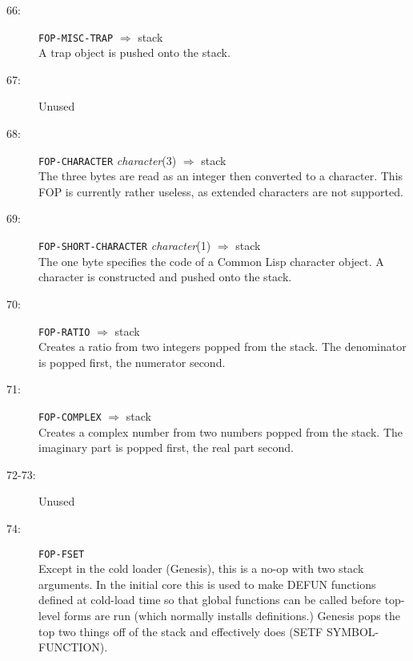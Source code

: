 \begin{description}
\item[66:] \hspace{2em} {\tt FOP-MISC-TRAP} \hspace{2em} $\Rightarrow$ \hspace{2em} stack \\
A trap object is pushed onto the stack.

\item[67:] Unused

\item[68:] \hspace{2em} {\tt FOP-CHARACTER} \hspace{2em} {\it character}(3) \hspace{2em} $\Rightarrow$ \hspace{2em} stack \\
The three bytes are read as an integer then converted to a character.  This FOP
is currently rather useless, as extended characters are not supported.

\item[69:] \hspace{2em} {\tt FOP-SHORT-CHARACTER} \hspace{2em} {\it character}(1) \hspace{2em}
$\Rightarrow$ \hspace{2em} stack \\
The one byte specifies the code of a Common Lisp character object.  A character
is constructed and pushed onto the stack.

\item[70:] \hspace{2em} {\tt FOP-RATIO} \hspace{2em} $\Rightarrow$ \hspace{2em} stack \\
Creates a ratio from two integers popped from the stack.
The denominator is popped first, the numerator second.

\item[71:] \hspace{2em} {\tt FOP-COMPLEX} \hspace{2em} $\Rightarrow$ \hspace{2em} stack \\
Creates a complex number from two numbers popped from the stack.
The imaginary part is popped first, the real part second.

\item[72-73:] Unused

\item[74:] \hspace{2em} {\tt FOP-FSET} \hspace{2em} \\
Except in the cold loader (Genesis), this is a no-op with two stack arguments.
In the initial core this is used to make DEFUN functions defined at cold-load
time so that global functions can be called before top-level forms are run
(which normally installs definitions.)  Genesis pops the top two things off of
the stack and effectively does (SETF SYMBOL-FUNCTION).


\end{description}
